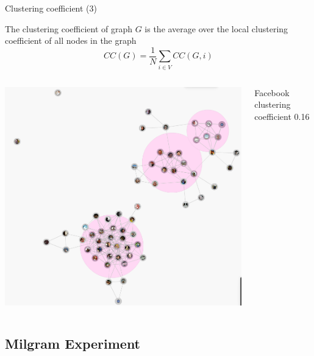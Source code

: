 \begin{frame}{Clustering coefficient (3)}

\begin{definition}

The \alert{clustering coefficient} of graph $G$ is the average over the local 
  clustering coefficient of all nodes in the graph
  \[
     CC(G) = \frac{1}{N} \sum_{i \in V} CC(G,i)
  \]
\end{definition}

\begin{columns}
	\begin{column}{0.35\textwidth}
		\includegraphics[width=\textwidth]{facebook}
	\end{column}
	\begin{column}{0.65\textwidth}
		\BI
		\item Facebook clustering coefficient 0.16
		\EI
	\end{column}
\end{columns}
\end{frame}

\subsection{Milgram Experiment}

